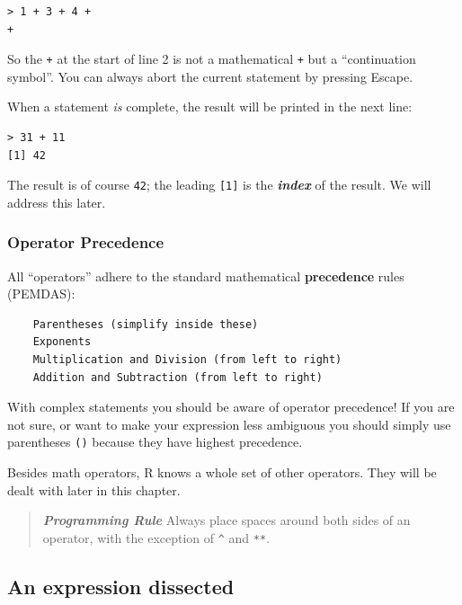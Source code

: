 \documentclass[]{book}
\begin{document}
\begin{verbatim}
> 1 + 3 + 4 + 
+ 
\end{verbatim}

So the \texttt{+} at the start of line 2 is not a mathematical \texttt{+} but a ``continuation symbol''. You can always abort the current statement by pressing Escape.

When a statement \emph{is} complete, the result will be printed in the next line:

\begin{verbatim}
> 31 + 11
[1] 42
\end{verbatim}

The result is of course \texttt{42}; the leading \texttt{{[}1{]}} is the \textbf{\emph{index}} of the result. We will address this later.

\hypertarget{operator-precedence}{%
\subsubsection*{Operator Precedence}\label{operator-precedence}}

All ``operators'' adhere to the standard mathematical \textbf{precedence} rules (PEMDAS):

\begin{verbatim}
    Parentheses (simplify inside these)
    Exponents
    Multiplication and Division (from left to right)
    Addition and Subtraction (from left to right)
\end{verbatim}

With complex statements you should be aware of operator precedence! If you are not sure, or want to make your expression less ambiguous you should simply use parentheses \texttt{()} because they have highest precedence.

Besides math operators, R knows a whole set of other operators. They will be dealt with later in this chapter.

\begin{quote}
\textbf{\emph{Programming Rule}} Always place spaces around both sides of an operator, with the exception of \texttt{\^{}} and \texttt{**}.
\end{quote}

\hypertarget{an-expression-dissected}{%
\subsection{An expression dissected}\label{an-expression-dissected}}
\end{document}
